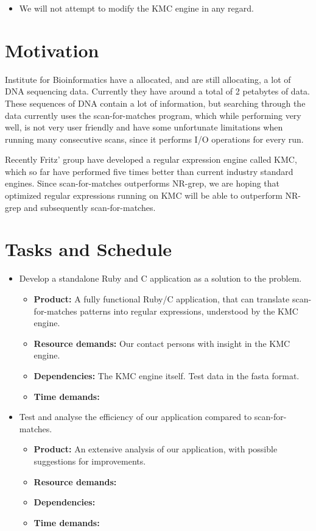 \documentclass[12pt]{article}
\begin{document}
\begin{itemize}
	\item We will not attempt to modify the KMC engine in any regard.
\end{itemize}

\section{Motivation}

Institute for Bioinformatics have a allocated, and are still allocating, a lot of DNA sequencing data. Currently they have around a total of 2 petabytes of data. These sequences of DNA contain a lot of information, but searching through the data currently uses the scan-for-matches program, which while performing very well, is not very user friendly and have some unfortunate limitations when running many consecutive scans, since it performs I/O operations for every run.

Recently Fritz' group have developed a regular expression engine called KMC, which so far have performed five times better than current industry standard engines. Since scan-for-matches outperforms NR-grep\cite{nrgrep}, we are hoping that optimized regular expressions running on KMC will be able to outperform NR-grep and subsequently scan-for-matches.

\section{Tasks and Schedule}

\begin{itemize}
	\item Develop a standalone Ruby and C application as a solution to the problem.
	\begin{itemize}
		\item \textbf{Product:} A fully functional Ruby/C application, that can translate scan-for-matches patterns into regular expressions, understood by the KMC engine.
		\item \textbf{Resource demands:} Our contact persons with insight in the KMC engine.
		\item \textbf{Dependencies:} The KMC engine itself. Test data in the fasta format.
		\item \textbf{Time demands:}
	\end{itemize}
	
	\item Test and analyse the efficiency of our application compared to scan-for-matches.
	\begin{itemize}
		\item \textbf{Product:} An extensive analysis of our application, with possible suggestions for improvements.
		\item \textbf{Resource demands:}
		\item \textbf{Dependencies:} 
		\item \textbf{Time demands:}
	\end{itemize}
\end{itemize}

\newpage



\end{document}
